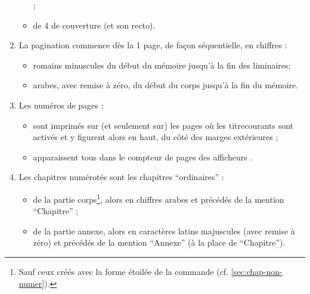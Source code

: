 \begin{enumerate}
\begin{itemize}
{    } ;
  \item de 4\ieme{} de couverture (et son recto).
  \end{itemize}
\item La \gls{pagination} commence dès la 1\iere{} page, de façon
  séquentielle, en chiffres :
  \begin{itemize}
  \item romains minuscules du début du mémoire jusqu'à la fin des
    \glspl{liminaire};
  \item arabes, avec remise à zéro, du début du corps jusqu'à la fin du
    mémoire.
  \end{itemize}
\item Les numéros de pages :
  \begin{itemize}
  \item sont imprimés sur (et seulement sur) les pages où les
    \glspl{titrecourant} sont activés et y figurent alors en haut, du côté des
    marges extérieures ;
  \item apparaissent tous dans le compteur de pages des afficheurs
    \pdf.
  \end{itemize}
\item Les chapitres numérotés sont les chapitres \enquote{ordinaires} :
  \begin{itemize}
  \item de la partie corps\footnote{Sauf ceux créés avec la forme étoilée de la
      commande  (cf. \vref{sec:chap-non-numer}).}, alors
    en chiffres arabes et précédés de la mention \enquote{Chapitre} ;
  \item de la partie annexe, alors en caractères latins majuscules (avec remise
    à zéro) et précédés de la mention \enquote{Annexe} (à la place de \enquote{Chapitre}).
  \end{itemize}
\end{enumerate}

%
\iffalse
\fi
